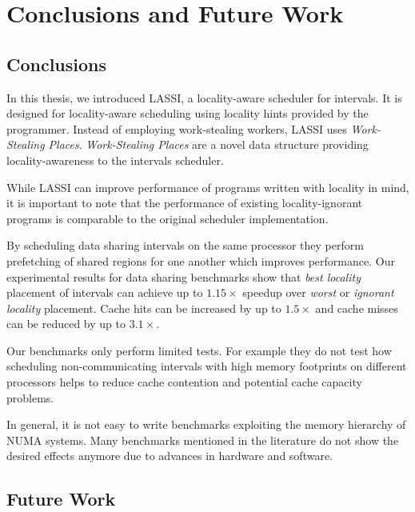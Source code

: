 
\chapter{Conclusions and Future Work}
\label{chap:locality-conclusions-and-future-work}

\section{Conclusions}
\label{sec:locality-conclusions-and-future-work-conclusions}

In this thesis, we introduced LASSI, a locality-aware scheduler for
intervals. It is designed for locality-aware scheduling using locality
hints provided by the programmer. Instead of employing work-stealing
workers, LASSI uses \emph{Work-Stealing Places}. \emph{Work-Stealing
  Places} are a novel data structure providing locality-awareness to
the intervals scheduler.

While LASSI can improve performance of programs written with locality
in mind, it is important to note that the performance of existing
locality-ignorant programs is comparable to the original scheduler
implementation.

By scheduling data sharing intervals on the same processor they
perform prefetching of shared regions for one another which improves
performance. Our experimental results for data sharing benchmarks show
that \emph{best locality} placement of intervals can achieve up to
$1.15\times$ speedup over \emph{worst} or \emph{ignorant locality}
placement. Cache hits can be increased by up to $1.5\times$ and cache
misses can be reduced by up to $3.1\times$.

Our benchmarks only perform limited tests. For example they do not
test how scheduling non-communicating intervals with high memory
footprints on different processors helps to reduce cache contention
and potential cache capacity problems.

In general, it is not easy to write benchmarks exploiting the memory
hierarchy of NUMA systems. Many benchmarks mentioned in the literature
do not show the desired effects anymore due to advances in hardware
and software.


\section{Future Work}
\label{sec:locality-conclusions-and-future-work-future-work}

